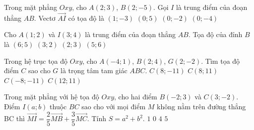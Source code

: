 \begin{ex}%
	Trong mặt phẳng $Oxy$, cho $A(2;3)$, $B(2;-5)$. Gọi $I$ là trung điểm của đoạn thẳng $AB$. Vectơ $\overrightarrow{AI}$ có tọa độ là
	\choice
	{$(1;-3)$}
	{$(0;5)$}
	{$(0;-2)$}
	{\True $(0;-4)$}
\end{ex}
\begin{ex}%
	Cho $A(1; 2)$ và $I(3; 4)$ là trung điểm của đoạn thẳng $AB$. Tọa độ của đỉnh $B$ là
	\choice
	{$(6; 5)$}
	{$(3; 2)$}
	{$(2; 3)$}
	{\True $(5; 6)$}
\end{ex}
\begin{ex}%
	Trong hệ trục tọa độ $Oxy$, cho $A(-4;1)$, $B(2;4)$, $G(2;-2)$. Tìm tọa độ điểm $C$ sao cho $G$ là trọng tâm tam giác $ABC$.
	\choice
	{\True $C(8;-11)$}
	{$C(8;11)$}
	{$C(-8;-11)$}
	{$C(12;11)$}
\end{ex}
\begin{ex}%
	Trong mặt phẳng với hệ tọa độ $Oxy$, cho hai điểm $B(-2;3)$ và $C(3;-2)$. Điểm $I(a;b)$ thuộc $BC$ sao cho với mọi điểm $M$ không nằm trên đường thẳng BC thì $\overrightarrow{MI}=\dfrac{2}{5}\overrightarrow{MB}+\dfrac{3}{5}\overrightarrow{MC}$. Tính $S=a^2+b^2$.
	\choice
	{\True $1$}
	{$0$}
	{$4$}
	{$5$}
\end{ex}
